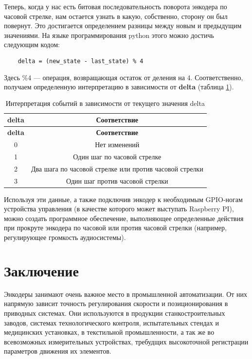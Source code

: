 Теперь, когда у нас есть битовая последовательность поворота энкодера по часовой стрелке, нам остается узнать в какую, собственно, сторону он был повернут. Это достигается определением разницы между новым и предыдущим значениями. На языке программирования python этого можно достичь следующим кодом:

\begin{verbatim}
    delta = (new_state - last_state) % 4
\end{verbatim}

Здесь \%4 --- операция, возвращающая остаток от деления на 4. Соответственно, получаем определенную интерпретацию в зависимости от \textbf{delta} (таблица \ref{tab:delta}).

\begin{longtable}[c]{|c|c|}
    \caption{Интерпретация событий в зависимости от текущего значения delta}
    \label{tab:delta}\\
    \hline
    \textbf{delta} & \textbf{Соответствие}\\
    \hline
    \endfirsthead
    \hline
    \textbf{delta} & \textbf{Соответствие}\\
    \hline
    \endhead
        0 & Нет изменений\\
        \hline
        1 & Один шаг по часовой стрелке\\
        \hline
        2 & Два шага по часовой стрелке или против часовой стрелки\\
        \hline
        3 & Один шаг против часовой стрелки\\
        \hline
\end{longtable}

Используя эти данные, а также подключив энкодер к необходимым GPIO-ногам устройства управления (в качестве которого может выступать Raspberry PI), можно создать программное обеспечение, выполняющее определенные действия при прокруте энкодера по часовой или против часовой стрелки (например, регулирующее громкость аудиосистемы).

\section*{Заключение}

Энкодеры занимают очень важное место в промышленной автоматизации. От них напрямую зависит точность регулирования скорости и позиционирования в приводных системах. Они используются в продукции станкостроительных заводов, системах технологического контроля, испытательных стендах и медицинских установках, в текстильной промышленности, а так же во всевозможных измерительных устройствах, требудщих высокоточной регистрации параметров движения их элементов.

